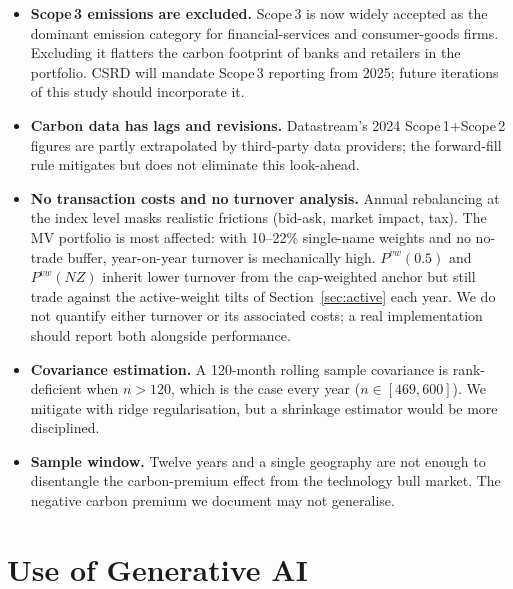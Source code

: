 \documentclass[11pt,a4paper]{article}
\begin{document}
\begin{itemize}[leftmargin=*]
  \item \textbf{Scope\,3 emissions are excluded.} Scope\,3 is now
        widely accepted as the dominant emission category for
        financial-services and consumer-goods firms. Excluding it
        flatters the carbon footprint of banks and retailers in the
        portfolio. CSRD will mandate Scope\,3 reporting from 2025;
        future iterations of this study should incorporate it.
  \item \textbf{Carbon data has lags and revisions.} Datastream's
        2024 Scope\,1$+$Scope\,2 figures are partly extrapolated by
        third-party data providers; the forward-fill rule mitigates
        but does not eliminate this look-ahead.
  \item \textbf{No transaction costs and no turnover analysis.} Annual
        rebalancing at the index level masks realistic frictions
        (bid-ask, market impact, tax). The MV portfolio is most
        affected: with 10--22\% single-name weights and no
        no-trade buffer, year-on-year turnover is mechanically high.
        $P^{vw}(0.5)$ and $P^{vw}(NZ)$ inherit lower turnover from the
        cap-weighted anchor but still trade against the active-weight
        tilts of Section~\ref{sec:active} each year. We do not
        quantify either turnover or its associated costs; a real
        implementation should report both alongside performance.
  \item \textbf{Covariance estimation.} A 120-month rolling sample
        covariance is rank-deficient when $n > 120$, which is the
        case every year ($n\in[469,600]$). We mitigate with ridge
        regularisation, but a shrinkage estimator
        \citep{LedoitWolf2004} would be more disciplined.
  \item \textbf{Sample window.} Twelve years and a single geography
        are not enough to disentangle the carbon-premium effect from
        the technology bull market. The negative carbon premium we
        document may not generalise.
\end{itemize}

\section{Use of Generative AI}\label{sec:llm}
\end{document}
